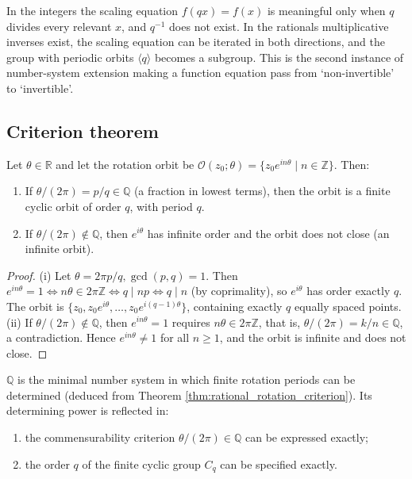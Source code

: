 \begin{remark}\label{rem:rational_makes_scaling_invertible}
In the integers the scaling equation $f(qx)=f(x)$ is meaningful only when $q$ divides every relevant $x$, and $q^{-1}$ does not exist. In the rationals multiplicative inverses exist, the scaling equation can be iterated in both directions, and the group with periodic orbits $\langle q\rangle$ becomes a subgroup. This is the second instance of number-system extension making a function equation pass from `non-invertible' to `invertible'.
\end{remark}

\subsection{\texorpdfstring{Criterion theorem}{Criterion theorem}}

\begin{theorem}\label{thm:rational_rotation_criterion}
Let $\theta \in \mathbb{R}$ and let the rotation orbit be $\mathcal{O}(z_0;\theta) = \{z_0 e^{in\theta} \mid n\in\mathbb{Z}\}$. Then:
\begin{enumerate}[label=(\roman*)]
    \item If $\theta/(2\pi) = p/q \in \mathbb{Q}$ (a fraction in lowest terms), then the orbit is a finite cyclic orbit of order $q$, with period $q$.
    \item If $\theta/(2\pi) \notin \mathbb{Q}$, then $e^{i\theta}$ has infinite order and the orbit does not close (an infinite orbit).
\end{enumerate}
\end{theorem}

\begin{proof}
(i) Let $\theta = 2\pi p/q, \gcd(p,q)=1$. Then $e^{in\theta}=1 \iff n\theta \in 2\pi\mathbb{Z} \iff q \mid np \iff q \mid n$ (by coprimality), so $e^{i\theta}$ has order exactly $q$. The orbit is $\{z_0, z_0 e^{i\theta}, \dots, z_0 e^{i(q-1)\theta}\}$, containing exactly $q$ equally spaced points.
(ii) If $\theta/(2\pi) \notin \mathbb{Q}$, then $e^{in\theta}=1$ requires $n\theta \in 2\pi\mathbb{Z}$, that is, $\theta/(2\pi)=k/n \in \mathbb{Q}$, a contradiction. Hence $e^{in\theta} \neq 1$ for all $n \geq 1$, and the orbit is infinite and does not close.
\end{proof}

\begin{corollary}\label{cor:rational_finite_rotation}
$\mathbb{Q}$ is the minimal number system in which finite rotation periods can be determined (deduced from Theorem \ref{thm:rational_rotation_criterion}). Its determining power is reflected in:
\begin{enumerate}[label=(\roman*)]
    \item the commensurability criterion $\theta/(2\pi) \in \mathbb{Q}$ can be expressed exactly;
    \item the order $q$ of the finite cyclic group $C_q$ can be specified exactly.
\end{enumerate}
\end{corollary}

